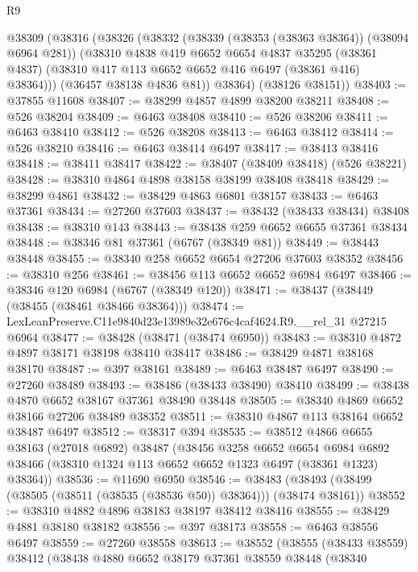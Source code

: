 \begin{lexlean}{R9}
\begin{coremodule}
    @38309
      (@38316
        (@38326
          (@38332
            (@38339 (@38353 (@38363 @38364)) (@38094 @6964 @281))
            (@38310
              @4838
              @419
              @6652
              @6654
              @4837
              @35295
              (@38361 @4837)
              (@38310 @417 @113 @6652 @6652 @416 @6497 (@38361 @416) @38364)))
          (@36457 @38138 @4836 @81))
        @38364)
      (@38126 @38151))
@38403 := @37855 @11608
@38407 := @38299 @4857 @4899 @38200 @38211
@38408 := @526 @38204
@38409 := @6463 @38408
@38410 := @526 @38206
@38411 := @6463 @38410
@38412 := @526 @38208
@38413 := @6463 @38412
@38414 := @526 @38210
@38416 := @6463 @38414 @6497
@38417 := @38413 @38416
@38418 := @38411 @38417
@38422 := @38407 (@38409 @38418) (@526 @38221)
@38428 := @38310 @4864 @4898 @38158 @38199 @38408 @38418
@38429 := @38299 @4861
@38432 := @38429 @4863 @6801 @38157
@38433 := @6463 @37361
@38434 := @27260 @37603
@38437 := @38432 (@38433 @38434) @38408
@38438 := @38310 @143
@38443 := @38438 @259 @6652 @6655 @37361 @38434
@38448 := @38346 @81 @37361 (@6767 (@38349 @81))
@38449 := @38443 @38448
@38455 := @38340 @258 @6652 @6654 @27206 @37603 @38352
@38456 := @38310 @256
@38461 := @38456 @113 @6652 @6652 @6984 @6497
@38466 := @38346 @120 @6984 (@6767 (@38349 @120))
@38471 := @38437 (@38449 (@38455 (@38461 @38466 @38364)))
@38474 := LexLeanPreserve.C11e9840d23e13989e32e676c4caf4624.R9.__rel_31 @27215 @6964
@38477 := @38428 (@38471 (@38474 @6950))
@38483 := @38310 @4872 @4897 @38171 @38198 @38410 @38417
@38486 := @38429 @4871 @38168 @38170
@38487 := @397 @38161
@38489 := @6463 @38487 @6497
@38490 := @27260 @38489
@38493 := @38486 (@38433 @38490) @38410
@38499 := @38438 @4870 @6652 @38167 @37361 @38490 @38448
@38505 := @38340 @4869 @6652 @38166 @27206 @38489 @38352
@38511 := @38310 @4867 @113 @38164 @6652 @38487 @6497
@38512 := @38317 @394
@38535 := @38512
    @4866
    @6655
    @38163
    (@27018 @6892)
    @38487
    (@38456
      @3258
      @6652
      @6654
      @6984
      @6892
      @38466
      (@38310 @1324 @113 @6652 @6652 @1323 @6497 (@38361 @1323) @38364))
@38536 := @11690 @6950
@38546 := @38483 (@38493 (@38499 (@38505 (@38511 (@38535 (@38536 @50)) @38364))) (@38474 @38161))
@38552 := @38310 @4882 @4896 @38183 @38197 @38412 @38416
@38555 := @38429 @4881 @38180 @38182
@38556 := @397 @38173
@38558 := @6463 @38556 @6497
@38559 := @27260 @38558
@38613 := @38552
    (@38555
      (@38433 @38559)
      @38412
      (@38438
        @4880
        @6652
        @38179
        @37361
        @38559
        @38448
        (@38340

\end{coremodule}
\end{lexlean}
